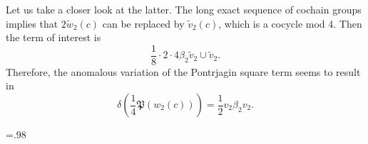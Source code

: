 \documentclass[12pt]{article}
\numberwithin{equation}{section}
\let\tilde\widetilde
\def\bZ{\mathbb{Z}}
\def\fP{\mathfrak{P}}
\begin{document}

Let us take a closer look at the latter.
The long exact sequence of cochain groups implies that $2\tilde w_2(c)$ can be replaced by
$\tilde v_2(c)$, which is a cocycle mod 4.
Then the term of interest is
\begin{equation*}
	\dfrac{1}{8}\cdot 2\cdot 4\beta_2\tilde v_2 \cup \tilde v_2.
\end{equation*}
Therefore, the anomalous variation of the Pontrjagin square term seems to result in
\begin{equation*}
	\delta\left(
		\dfrac{1}{4}\fP(w_2(c))
	\right)
	=
	\dfrac{1}{2}v_2 \beta_2 v_2.
\end{equation*}
\fi

\def\arxivfont{\rm}


\baselineskip=.98\baselineskip
\let\originalthebibliography\thebibliography
\renewcommand\thebibliography[1]{
  \originalthebibliography{#1}
  \setlength{\itemsep}{0pt plus 0.3ex}
}


\end{document}
